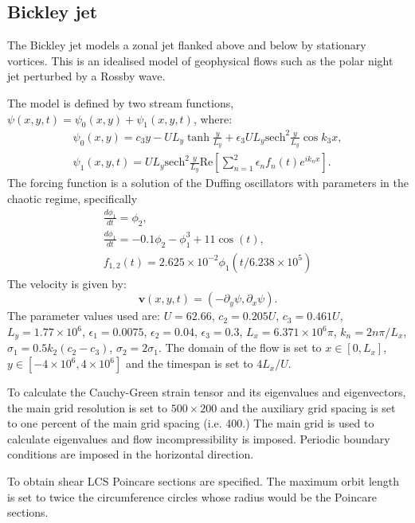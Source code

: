 \documentclass{article}
\begin{document}
\subsection{Bickley jet}

The Bickley jet models a zonal jet flanked above and below by
stationary vortices. This is an idealised model of geophysical flows
such as the polar night jet perturbed by a Rossby
wave\parencite{beron-vera10:_invar_lagran,haller12:_geodes_theor_trans_barrier_two_dimen_flows}.

The model is defined by two stream functions, $\psi(x,y,t) = \psi_0(x,y) + \psi_1(x,y,t)$, where:
\begin{gather*}
\psi_0(x,y) = c_3 y - U L_y \tanh\frac{y}{L_y} + \epsilon_3 U L_y \mathrm{sech}^2\frac{y}{L_y} \cos k_3 x,\\
\psi_1(x,y,t) = U L_y \mathrm{sech}^2\frac{y}{L_y} \mathrm{Re}\left[ \sum_{n=1}^2 \epsilon_n f_n(t) e^{i k_n x}\right].
\end{gather*}
The forcing function is a solution of the Duffing oscillators with parameters in the chaotic regime, specifically
\begin{gather*}
\frac{d \phi_1}{dt} = \phi_2,\\
\frac{d \phi_1}{dt} = -0.1 \phi_2 - \phi_1^3 + 11 \cos(t),\\
f_{1,2}(t) = 2.625 \times 10^{-2} \phi_1(t/6.238 \times 10^5)
\end{gather*}
The velocity is given by:
\[
\boldsymbol{v}(x,y,t) = (-\partial_y \psi, \partial_x \psi).
\]
The parameter values used are: $U = 62.66$, $c_2 = 0.205 U$, $c_3 = 0.461 U$, $L_y = 1.77 \times 10^6$, $\epsilon_1 = 0.0075$, $\epsilon_2 = 0.04$, $\epsilon_3 = 0.3$, $L_x = 6.371 \times 10^6 \pi$, $k_n = 2 n \pi/L_x$, $\sigma_1 = 0.5 k_2 (c_2 - c_3)$, $\sigma_2 = 2 \sigma_1$. The domain of the flow is set to $x \in [0,L_x]$, $y \in [-4 \times 10^6, 4 \times 10^6]$ and the timespan is set to $4 L_x/U$.

To calculate the Cauchy-Green strain tensor and its eigenvalues and eigenvectors, the main grid resolution is set to $500 \times 200$ and the auxiliary grid spacing is set to one percent of the main grid spacing (i.e. 400.) The main grid is used to calculate eigenvalues and flow incompressibility is imposed. Periodic boundary conditions are imposed in the horizontal direction. 

To obtain shear LCS Poincare sections are specified. The maximum orbit length is set to twice the circumference circles whose radius would be the Poincare sections.
\end{document}
